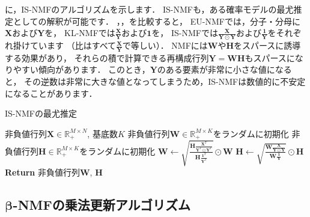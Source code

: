 に，IS-NMFのアルゴリズムを示します．
IS-NMFも，ある確率モデルの最尤推定としての解釈が可能です．
，，を比較すると，
EU-NMFでは，分子・分母に$\bm{X}$および$\bm{Y}$を，
KL-NMFでは$\frac{\bm{X}}{\bm{Y}}$および$\bm{1}$を，
IS-NMFでは$\frac{\bm{X}}{\bm{Y}\odot\bm{Y}}$および$\frac{\bm{1}}{\bm{Y}}$をそれぞれ掛けています
（比はすべて$\frac{\bm{X}}{\bm{Y}}$で等しい）．
NMFには$\bm{W}$や$\bm{H}$をスパースに誘導する効果があり，
それらの積で計算できる再構成行列$\bm{Y}=\bm{W}\bm{H}$もスパースになりやすい傾向があります．
このとき，$\bm{Y}$のある要素が非常に小さな値になると，
その逆数は非常に大きな値となってしまうため，IS-NMFは数値的に不安定になることがあります．

\begin{algobox}{IS-NMFの最尤推定}
\label{algo:is-nmf-ml}
\begin{algorithmic}[1]
\Require 非負値行列$\bm{X} \in \mathbb{R}_+^{M \times N}$, 基底数$K$
\State 非負値行列$\bm{W} \in \mathbb{R}_+^{M \times K}$をランダムに初期化
\State 非負値行列$\bm{H} \in \mathbb{R}_+^{M \times K}$をランダムに初期化
\State $\displaystyle \bm{W} \gets \sqrt{\frac{\bm{H} \frac{\bm{X}^T}{\bm{Y}^T \odot \bm{Y}^T}} {\bm{H}\frac{\bm{1}^T}{\bm{Y}^T}}} \odot \bm{W}$ 
\State $\displaystyle \bm{H} \gets \sqrt{\frac{\bm{W} \frac{\bm{X}}{\bm{Y} \odot \bm{Y}}} {\bm{W}\frac{\bm{1}}{\bm{Y}}}} \odot \bm{H}$ 
\EndWhile\\
{\bf Return} 非負値行列$\bm{W}$, $\bm{H}$
\end{algorithmic}
\end{algobox}

\subsection{$\bm\beta$-NMFの乗法更新アルゴリズム}

